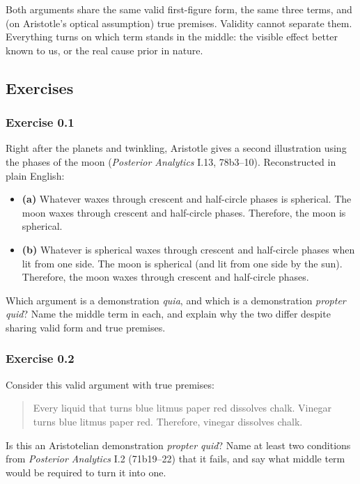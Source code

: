 Both arguments share the same valid first-figure form, the same three terms, and (on Aristotle's optical assumption) true premises. Validity cannot separate them. Everything turns on which term stands in the middle: the visible effect better known to us, or the real cause prior in nature.

\subsection{Exercises}

\subsubsection*{Exercise 0.1}
Right after the planets and twinkling, Aristotle gives a second illustration using the phases of the moon (\emph{Posterior Analytics} I.13, 78b3--10). Reconstructed in plain English:

\begin{itemize}
\item \textbf{(a)} Whatever waxes through crescent and half-circle phases is spherical. The moon waxes through crescent and half-circle phases. Therefore, the moon is spherical.
\item \textbf{(b)} Whatever is spherical waxes through crescent and half-circle phases when lit from one side. The moon is spherical (and lit from one side by the sun). Therefore, the moon waxes through crescent and half-circle phases.
\end{itemize}

Which argument is a demonstration \emph{quia}, and which is a demonstration \emph{propter quid}? Name the middle term in each, and explain why the two differ despite sharing valid form and true premises.

\subsubsection*{Exercise 0.2}
Consider this valid argument with true premises:

\begin{quote}
Every liquid that turns blue litmus paper red dissolves chalk. Vinegar turns blue litmus paper red. Therefore, vinegar dissolves chalk.
\end{quote}

Is this an Aristotelian demonstration \emph{propter quid}? Name at least two conditions from \emph{Posterior Analytics} I.2 (71b19--22) that it fails, and say what middle term would be required to turn it into one.

